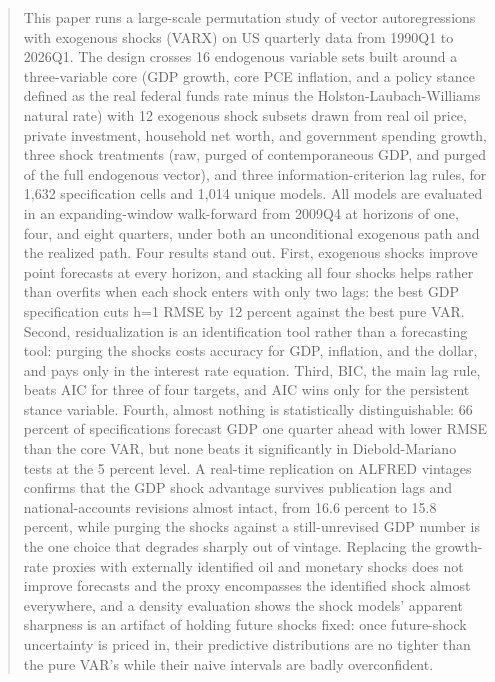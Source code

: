 \documentclass[conference]{IEEEtran}
\begin{document}
\begin{abstract}
This paper runs a large-scale permutation study of vector autoregressions with exogenous shocks (VARX) on US quarterly data from 1990Q1 to 2026Q1. The design crosses 16 endogenous variable sets built around a three-variable core (GDP growth, core PCE inflation, and a policy stance defined as the real federal funds rate minus the Holston-Laubach-Williams natural rate) with 12 exogenous shock subsets drawn from real oil price, private investment, household net worth, and government spending growth, three shock treatments (raw, purged of contemporaneous GDP, and purged of the full endogenous vector), and three information-criterion lag rules, for 1{,}632 specification cells and 1{,}014 unique models. All models are evaluated in an expanding-window walk-forward from 2009Q4 at horizons of one, four, and eight quarters, under both an unconditional exogenous path and the realized path. Four results stand out. First, exogenous shocks improve point forecasts at every horizon, and stacking all four shocks helps rather than overfits when each shock enters with only two lags: the best GDP specification cuts h=1 RMSE by 12 percent against the best pure VAR. Second, residualization is an identification tool rather than a forecasting tool: purging the shocks costs accuracy for GDP, inflation, and the dollar, and pays only in the interest rate equation. Third, BIC, the main lag rule, beats AIC for three of four targets, and AIC wins only for the persistent stance variable. Fourth, almost nothing is statistically distinguishable: 66 percent of specifications forecast GDP one quarter ahead with lower RMSE than the core VAR, but none beats it significantly in Diebold-Mariano tests at the 5 percent level. A real-time replication on ALFRED vintages confirms that the GDP shock advantage survives publication lags and national-accounts revisions almost intact, from 16.6 percent to 15.8 percent, while purging the shocks against a still-unrevised GDP number is the one choice that degrades sharply out of vintage. Replacing the growth-rate proxies with externally identified oil and monetary shocks does not improve forecasts and the proxy encompasses the identified shock almost everywhere, and a density evaluation shows the shock models' apparent sharpness is an artifact of holding future shocks fixed: once future-shock uncertainty is priced in, their predictive distributions are no tighter than the pure VAR's while their naive intervals are badly overconfident.
\end{abstract}
\end{document}
